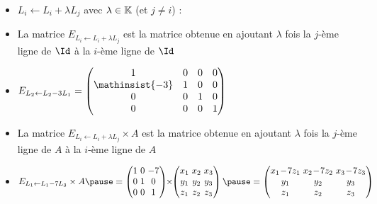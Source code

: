 \begin{frame}
\begin{itemize}\setlength{\itemsep}{8pt}
  \item $L_i \leftarrow L_i+\lambda L_j$ avec $\lambda \in \mathbb{K}$ (et $j\neq i$) :
\pause  
  \item  La matrice $E_{L_i \leftarrow L_i+\lambda L_j}$ est la  matrice
obtenue en ajoutant $\lambda$ fois la $j$-ème ligne de $\Id$ à la $i$-ème ligne de $\Id$
\pause

  \item $  E_{L_2 \leftarrow L_2 -3 L_1}=
    \begin{pmatrix}
    1 & 0 & 0 & 0\\
    \mathinsist{-3} & 1 & 0 & 0\\
    0 & 0 & 1 & 0\\
    0 & 0 & 0 & 1
    \end{pmatrix}$
    
\pause    
  \item La matrice $E_{L_i \leftarrow L_i+\lambda L_j} \times A$ est la  matrice obtenue 
  en ajoutant $\lambda$ fois la $j$-ème ligne de $A$ à la $i$-ème ligne de $A$
\pause  
  
  \item {\small $E_{L_1 \leftarrow L_1-7 L_3}  \times A
  \pause
\arraycolsep=1.6pt
= \begin{pmatrix}
  1&0&-7\\0&1&0\\0&0&1  
  \end{pmatrix}
  \!\!\times\!\!
  \begin{pmatrix}
  x_1&x_2&x_3\\y_1&y_2&y_3\\z_1&z_2&z_3  
  \end{pmatrix}
\pause
    =   \begin{pmatrix}
  x_1\!-\!7z_1&x_2\!-\!7z_2&x_3\!-\!7z_3\\ y_1&y_2&y_3\\z_1&z_2&z_3  
  \end{pmatrix}
$
%  
}
\end{itemize}

 
\end{frame}


